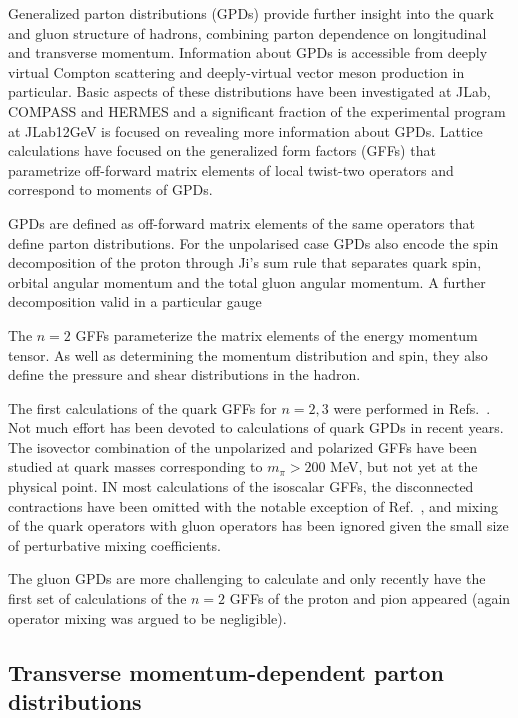 Generalized parton distributions (GPDs) \cite{Ji:2001wha,Radyushkin:1997ki,Diehl:2003ny,Belitsky:2005qn} provide further insight into the quark and gluon structure of hadrons, combining parton dependence on longitudinal and transverse momentum. Information about GPDs is accessible from deeply virtual Compton scattering and deeply-virtual vector meson production in particular. Basic aspects of these distributions have been investigated at JLab, COMPASS and HERMES and a significant fraction of the experimental program at JLab12GeV is focused on revealing more  information about  GPDs. Lattice calculations have focused on the generalized form factors (GFFs) that parametrize off-forward matrix elements of local twist-two operators and correspond to moments of GPDs. 

GPDs are defined as  off-forward matrix elements of the same operators that define parton distributions. For the unpolarised case
GPDs also encode the spin decomposition of the proton through Ji's sum rule \cite{Ji:1996ek} that separates quark spin, orbital angular momentum and the total gluon angular momentum. A further decomposition valid in a particular gauge

The $n=2$ GFFs  parameterize the matrix elements of the energy momentum tensor. As well as determining the momentum distribution and spin, they 
also define the pressure and shear distributions in the hadron.

The first calculations of the quark GFFs for $n=2,3$ were performed in Refs.~\cite{FIXME}. Not much effort has been devoted to calculations of quark GPDs in recent years. The isovector combination of the unpolarized and polarized GFFs have been studied at quark masses corresponding to $m_\pi>200$ MeV, but not yet at the physical point. IN most calculations of the isoscalar GFFs, the disconnected contractions have been omitted with the notable exception of Ref.~\cite{Deka:2013zha}, and mixing of the quark operators with gluon operators has been ignored given the small size of perturbative mixing coefficients. 

The gluon GPDs are more challenging to calculate and only recently have the first set of calculations of the $n=2$ GFFs of the proton and pion appeared (again operator mixing was argued to be negligible).


\subsection{Transverse momentum-dependent parton distributions}

